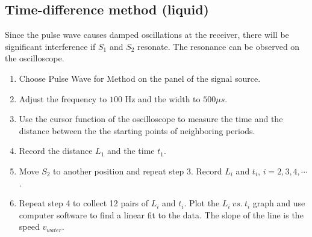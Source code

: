 \subsection{Time-difference method (liquid)}
    Since the pulse wave causes damped oscillations at the receiver, there will be significant interference if $S_1$ and $S_2$ resonate. The resonance can be observed on the oscilloscope.
    \begin{enumerate}
        \item Choose Pulse Wave for Method on the panel of the signal source.
        \item Adjust the frequency to $100$ Hz and the width to $500 \mu s$.
        \item Use the cursor function of the oscilloscope to measure the time and the distance between the the starting points of neighboring periods.
        \item Record the distance $L_1$ and the time $t_1$.
        \item Move $S_2$ to another position and repeat step 3. Record $L_i$ and $t_i$, $i = 2, 3, 4, \cdots$.
        \item Repeat step 4 to collect 12 pairs of $L_i$ and $t_i$. Plot the $L_i\ vs.\ t_i$ graph and use computer software to find a linear fit to the data. The slope of the line is the speed $v_{water}$.
    \end{enumerate}

